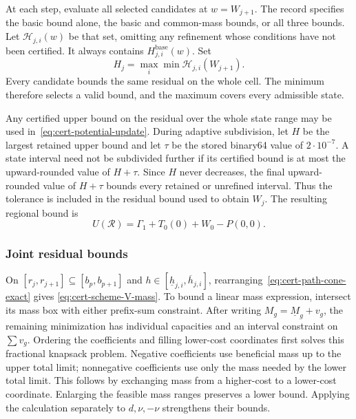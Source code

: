 \documentclass[11pt]{article}
\theoremstyle{definition}
\theoremstyle{remark}
\begin{document}
At each step, evaluate all selected candidates at $w=W_{j+1}$.
The record specifies the basic bound alone, the basic and common-mass
bounds, or all three bounds.  Let $\mathcal H_{j,i}(w)$ be that set,
omitting any refinement whose conditions have not been certified.
It always contains $H_{j,i}^{\mathrm{base}}(w)$.  Set
\begin{equation}\label{eq:cert-scheme-residual}
 H_j=\max_i\min\mathcal H_{j,i}(W_{j+1}).
\end{equation}
Every candidate bounds the same residual on the whole cell.  The minimum
therefore selects a valid bound, and the maximum covers every admissible
state.

Any certified upper bound on the residual over the whole state range
may be used in~\eqref{eq:cert-potential-update}.
During adaptive subdivision, let $H$ be the largest retained upper
bound and let $\tau$ be the stored binary64 value of $2\cdot10^{-7}$.
A state interval need not be subdivided further if its certified bound
is at most the upward-rounded value of $H+\tau$.
Since $H$ never decreases, the final upward-rounded value of $H+\tau$
bounds every retained or unrefined interval.  Thus the tolerance is
included in the residual bound used to obtain $W_j$.
The resulting regional bound is
\begin{equation}\label{eq:cert-bellman-scheme-upper}
 U(\mathcal R)=\Gamma_1+T_0(0)+W_0-P(0,0).
\end{equation}

\subsubsection{Joint residual bounds}
\label{app:cert-local-tightening}

On
$[r_j,r_{j+1}]\subseteq[b_p,b_{p+1}]$ and
$h\in[\underline h_{j,i},\overline h_{j,i}]$,
rearranging~\eqref{eq:cert-path-cone-exact} gives
\eqref{eq:cert-scheme-V-mass}.
To bound a linear mass expression, intersect its mass box with either
prefix-sum constraint.  After writing $M_g=\underline M_g+v_g$, the
remaining minimization has individual capacities and an interval constraint
on $\sum v_g$.  Ordering the coefficients and filling lower-cost coordinates
first solves this fractional knapsack problem.  Negative coefficients use
beneficial mass up to the upper total limit; nonnegative coefficients use
only the mass needed by the lower total limit.
This follows by exchanging mass from a higher-cost to a lower-cost
coordinate.  Enlarging the feasible mass ranges preserves a lower bound.
Applying the calculation separately to $d,\nu,-\nu$ strengthens their bounds.
\end{document}
